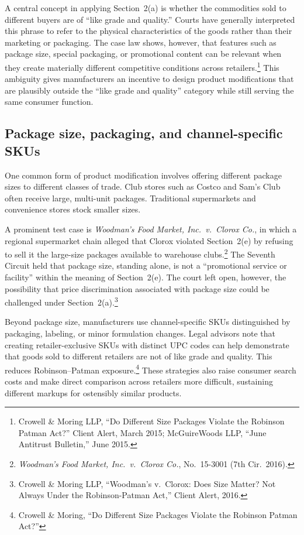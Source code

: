 \documentclass[12pt]{article}
\theoremstyle{definition}
\begin{document}
A central concept in applying Section~2(a) is whether the commodities sold to different buyers are of ``like grade and quality.''
Courts have generally interpreted this phrase to refer to the physical characteristics of the goods rather than their marketing or packaging.
The case law shows, however, that features such as package size, special packaging, or promotional content can be relevant when they create materially different competitive conditions across retailers.\footnote{Crowell \& Moring LLP, ``Do Different Size Packages Violate the Robinson Patman Act?'' Client Alert, March 2015; McGuireWoods LLP, ``June Antitrust Bulletin,'' June 2015.}
This ambiguity gives manufacturers an incentive to design product modifications that are plausibly outside the ``like grade and quality'' category while still serving the same consumer function.

\subsection{Package size, packaging, and channel-specific SKUs}

One common form of product modification involves offering different package sizes to different classes of trade.
Club stores such as Costco and Sam's Club often receive large, multi-unit packages. Traditional supermarkets and convenience stores stock smaller sizes.

A prominent test case is \textit{Woodman's Food Market, Inc.\ v.\ Clorox Co.}, in which a regional supermarket chain alleged that Clorox violated Section~2(e) by refusing to sell it the large-size packages available to warehouse clubs.\footnote{\textit{Woodman's Food Market, Inc.\ v.\ Clorox Co.}, No.\ 15-3001 (7th Cir.\ 2016).}
The Seventh Circuit held that package size, standing alone, is not a ``promotional service or facility'' within the meaning of Section~2(e).
The court left open, however, the possibility that price discrimination associated with package size could be challenged under Section~2(a).\footnote{Crowell \& Moring LLP, ``Woodman's v.\ Clorox: Does Size Matter? Not Always Under the Robinson-Patman Act,'' Client Alert, 2016.}

Beyond package size, manufacturers use channel-specific SKUs distinguished by packaging, labeling, or minor formulation changes.
Legal advisors note that creating retailer-exclusive SKUs with distinct UPC codes can help demonstrate that goods sold to different retailers are not of like grade and quality. This reduces Robinson--Patman exposure.\footnote{Crowell \& Moring, ``Do Different Size Packages Violate the Robinson Patman Act?''}
These strategies also raise consumer search costs and make direct comparison across retailers more difficult, sustaining different markups for ostensibly similar products.
\end{document}
